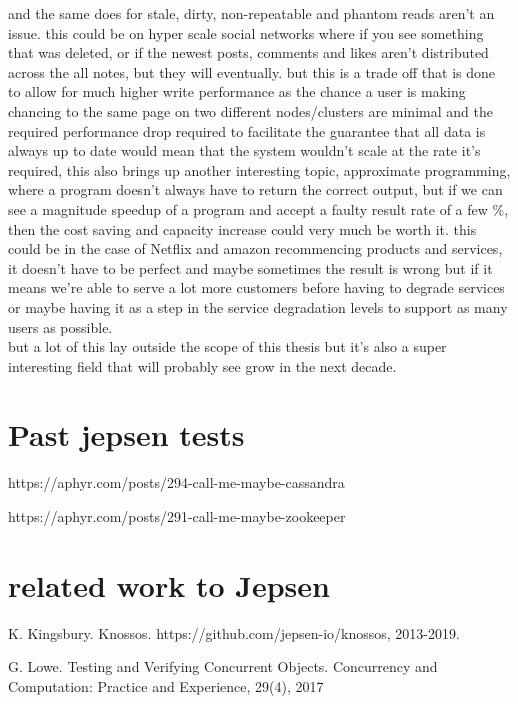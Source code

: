 \documentclass[a4paper,10pt,titlepage]{report}
\begin{document}
    and the same does for stale, dirty, non-repeatable and phantom reads aren't an issue. this could be on hyper scale social networks where if you see something that was deleted, or if the newest posts, comments and likes aren't distributed across the all notes, but they will eventually. but this is a trade off that is done to allow for much higher write performance as the chance a user is making chancing to the same page on two different nodes/clusters are minimal and the required performance drop required to facilitate the guarantee that all data is always up to date would mean that the system wouldn't scale at the rate it's required, this also brings up another interesting topic, approximate programming, where a program doesn't always have to return the correct output, but if we can see a magnitude speedup of a program and accept a faulty result rate of a few \%, then the cost saving and capacity increase could very much be worth it. this could be in the case of Netflix and amazon recommencing products and services, it doesn't have to be perfect and maybe sometimes the result is wrong but if it means we're able to serve a lot more customers before having to degrade services or maybe having it as a step in the service degradation levels to support as many users as possible. \\
    \vspace{5mm}
    but a lot of this lay outside the scope of this thesis but it's also a super interesting field that will probably see grow in the next decade.


    \section{Past jepsen tests}
    https://aphyr.com/posts/294-call-me-maybe-cassandra


    https://aphyr.com/posts/291-call-me-maybe-zookeeper


    \section{related work to Jepsen}

    K. Kingsbury. Knossos.
    https://github.com/jepsen-io/knossos, 2013-2019.

    G. Lowe. Testing and Verifying Concurrent Objects.
    Concurrency and Computation: Practice and
    Experience, 29(4), 2017
\end{document}
